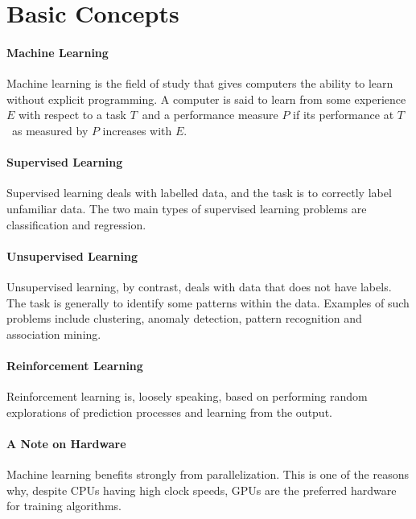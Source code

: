\section{Basic Concepts}

\paragraph{Machine Learning}
Machine learning is the field of study that gives computers the ability to learn without explicit programming. A computer is said to learn from some experience $E$ with respect to a task $T$ and a performance measure $P$ if its performance at $T$ as measured by $P$ increases with $E$.

\paragraph{Supervised Learning}
Supervised learning deals with labelled data, and the task is to correctly label unfamiliar data. The two main types of supervised learning problems are classification and regression.

\paragraph{Unsupervised Learning}
Unsupervised learning, by contrast, deals with data that does not have labels. The task is generally to identify some patterns within the data. Examples of such problems include clustering, anomaly detection, pattern recognition and association mining.

\paragraph{Reinforcement Learning}
Reinforcement learning is, loosely speaking, based on performing random explorations of prediction processes and learning from the output.

\paragraph{A Note on Hardware}
Machine learning benefits strongly from parallelization. This is one of the reasons why, despite CPUs having high clock speeds, GPUs are the preferred hardware for training algorithms.

